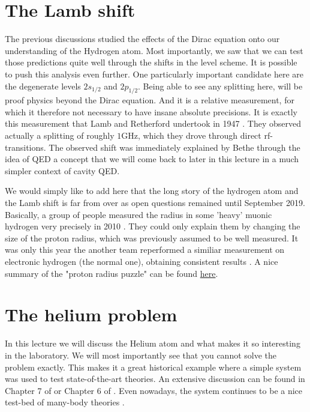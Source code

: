 \documentclass[10pt]{article}
\let\cite\citep
\providecommand\citep{\cite}
\begin{document}
\section{The Lamb shift}

The previous discussions studied the effects of the Dirac equation onto our understanding of the Hydrogen atom. Most importantly, we saw that we can test those predictions quite well through the shifts in the level scheme. It is possible to push this analysis even further. One particularly important candidate here are the degenerate levels $2s_{1/2}$ and $2p_{1/2}$. Being able to see any splitting here, will be proof physics beyond the Dirac equation. And it is a relative measurement, for which it therefore not necessary to have insane absolute precisions. It is exactly this measurement that Lamb and Retherford undertook in 1947 \cite{Lamb_1947}. They observed actually a splitting of roughly $1$GHz, which they drove through direct rf-transitions. The observed shift was immediately explained by Bethe \cite{Bethe_1947} through the idea of QED a concept that we will come back to later in this lecture in a much simpler context of cavity QED.

We would simply like to add here that the long story of the hydrogen atom and the Lamb shift is far from over as open questions remained until September 2019. Basically, a group of people measured the radius in some 'heavy' muonic hydrogen very precisely in 2010 \cite{Pohl_2010}. They could only explain them by changing the size of the proton radius, which was previously assumed to be well measured. It was only this year the another team reperformed a similiar measurement on electronic hydrogen (the normal one), obtaining consistent results \cite{Bezginov_2019}. A nice summary of the "proton radius puzzle" can be found \href{https://www.quantamagazine.org/physicists-finally-nail-the-protons-size-and-hope-dies-20190911/}{here}. 

\section{The helium problem}

In this lecture we will discuss the Helium atom and what makes it so interesting in the laboratory. We will most importantly see that you cannot solve the problem exactly. This makes it a great historical example where a simple system was used to test state-of-the-art theories. An extensive discussion can be found in Chapter 7 of \cite{bransden2003physics} or Chapter 6 of  \cite{Demtr_der_2010}. Even nowadays, the system continues to be a nice test-bed of many-body theories \cite{Combescot_2017, Ott_2019}.
\end{document}
